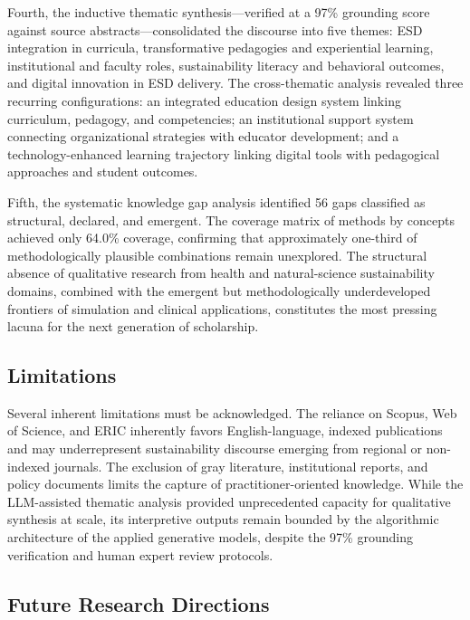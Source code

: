\documentclass[pdflatex,sn-basic]{sn-jnl}%
\begin{document}
Fourth, the inductive thematic synthesis---verified at a 97\% grounding score against source abstracts---consolidated the discourse into five themes: ESD integration in curricula, transformative pedagogies and experiential learning, institutional and faculty roles, sustainability literacy and behavioral outcomes, and digital innovation in ESD delivery. The cross-thematic analysis revealed three recurring configurations: an integrated education design system linking curriculum, pedagogy, and competencies; an institutional support system connecting organizational strategies with educator development; and a technology-enhanced learning trajectory linking digital tools with pedagogical approaches and student outcomes.

Fifth, the systematic knowledge gap analysis identified 56 gaps classified as structural, declared, and emergent. The coverage matrix of methods by concepts achieved only 64.0\% coverage, confirming that approximately one-third of methodologically plausible combinations remain unexplored. The structural absence of qualitative research from health and natural-science sustainability domains, combined with the emergent but methodologically underdeveloped frontiers of simulation and clinical applications, constitutes the most pressing lacuna for the next generation of scholarship.

\subsection{Limitations}

Several inherent limitations must be acknowledged. The reliance on Scopus, Web of Science, and ERIC inherently favors English-language, indexed publications and may underrepresent sustainability discourse emerging from regional or non-indexed journals. The exclusion of gray literature, institutional reports, and policy documents limits the capture of practitioner-oriented knowledge. While the LLM-assisted thematic analysis provided unprecedented capacity for qualitative synthesis at scale, its interpretive outputs remain bounded by the algorithmic architecture of the applied generative models, despite the 97\% grounding verification and human expert review protocols.

\subsection{Future Research Directions}
\end{document}
